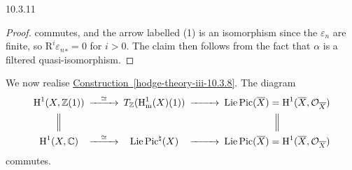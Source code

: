 \begin{lemma}{10.3.11}
\begin{proof}

      commutes, and the arrow labelled (1) is an isomorphism since the \(\varepsilon _n\) are finite, so \(\mathrm {R}^i{\varepsilon _n}_*=0\) for \(i>0\).
      The claim then follows from the fact that \(\alpha \) is a filtered quasi-isomorphism.\end{proof}\end{lemma}\label{hodge-theory-iii-10.3.12}\par{}We now realise \hyperref[hodge-theory-iii-10.3.8]{Construction~\ref*{hodge-theory-iii-10.3.8}}.
    The diagram
    \[       \begin {CD}         \operatorname {H}^1(X,\mathbb {Z}(1)) @>{\simeq }>> T_\mathbb {Z}(\operatorname {H}_\mathrm {m}^1(X)(1)) @>>> \operatorname {Lie}\operatorname {Pic}(\overline {X}) = \operatorname {H}^1(\overline {X},\mathcal {O}_{\overline {X}})       \\ @| @. @|       \\\operatorname {H}^1(X,\mathbb {C}) @>{\simeq }>> \operatorname {Lie}\operatorname {Pic}^\natural (X) @>>> \operatorname {Lie}\operatorname {Pic}(\overline {X}) = \operatorname {H}^1(\overline {X},\mathcal {O}_{\overline {X}})       \end {CD}     \]
    commutes.
